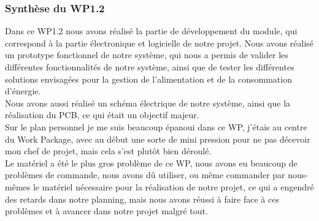\subsubsection{Synthèse du WP1.2}

Dans ce WP1.2 nous avons réalisé la partie de développement du module, qui correspond à la partie électronique et logicielle 
de notre projet. Nous avons réalisé un prototype fonctionnel de notre système, qui nous a permis de valider les différentes 
fonctionnalités de notre système, ainsi que de tester les différentes solutions envisagées pour la gestion de l'alimentation 
et de la consommation d'énergie.
\\

Nous avons aussi réalisé un schéma électrique de notre système, ainsi que la réalisation du PCB, ce qui était un objectif majeur.
\\

Sur le plan personnel je me suis beaucoup épanoui dans ce WP, j'étais au centre du Work Package, avec au début une sorte de mini pression
pour ne pas décevoir mon chef de projet, mais cela s'est plutôt bien déroulé.
\\

Le matériel a été le plus gros problème de ce WP, nous avons eu beaucoup de problèmes de commande, nous avons dû utiliser, ou même commander 
par nous-mêmes le matériel nécessaire pour la réalisation de notre projet, ce qui a engendré des retards dans notre planning,
mais nous avons réussi à faire face à ces problèmes et à avancer dans notre projet malgré tout.
\\

